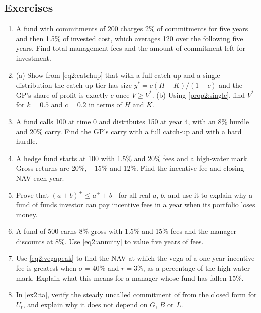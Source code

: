 \begin{chapterrefs}
\FloatBarrier
\section{Exercises}
\label{sec2:exercises}

\begin{enumerate}[label=\textbf{\thechapter.\arabic*}, leftmargin=*]
  \item\label{exr2:1} A fund with commitments of 200 charges 2\% of commitments for five years and then
        1.5\% of invested cost, which averages 120 over the following five years. Find total
        management fees and the amount of commitment left for investment.
  \item\label{exr2:2} (a) Show from \cref{eq2:catchup} that with a full catch-up and a single
        distribution the catch-up tier has size $y^* = c(H-K)/(1-c)$ and the GP's share of profit is
        exactly $c$ once $V \ge V^*$. (b) Using \cref{prop2:single}, find $V^*$ for $k = 0.5$ and $c = 0.2$ in
        terms of $H$ and $K$.
  \item\label{exr2:3} A fund calls 100 at time 0 and distributes 150 at year 4, with an 8\% hurdle
        and 20\% carry. Find the GP's carry with a full catch-up and with a hard hurdle.
  \item\label{exr2:4} A hedge fund starts at 100 with 1.5\% and 20\% fees and a high-water mark.
        Gross returns are 20\%, $-15\%$ and 12\%. Find the incentive fee and closing NAV each year.
  \item\label{exr2:5} Prove that $(a+b)^{+} \le a^{+} + b^{+}$ for all real $a$, $b$, and use it to
        explain why a fund of funds investor can pay incentive fees in a year when its portfolio loses
        money.
  \item\label{exr2:6} A fund of 500 earns 8\% gross with 1.5\% and 15\% fees and the manager discounts
        at 8\%. Use \cref{eq2:annuity} to value five years of fees.
  \item\label{exr2:7} Use \cref{eq2:vegapeak} to find the NAV at which the vega of a one-year
        incentive fee is greatest when $\sigma = 40\%$ and $r = 3\%$, as a percentage of the high-water
        mark. Explain what this means for a manager whose fund has fallen 15\%.
  \item\label{exr2:8} In \cref{ex2:ta}, verify the steady uncalled commitment of
        \progUncalledSteady{} from the closed form for $U_t$, and explain why it does not depend on
        $G$, $B$ or $L$.
\end{enumerate}


\end{chapterrefs}
